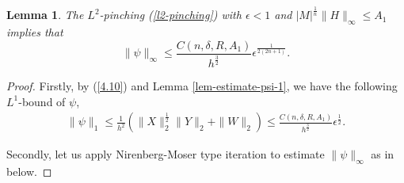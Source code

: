\documentclass{amsart}
\numberwithin{equation}{section}
\newtheorem{lem}[theo]{Lemma}
\theoremstyle{remark}
\renewcommand{\(}{\left(}
\renewcommand{\)}{\right)}
\renewcommand{\~}{\tilde}
\renewcommand{\-}{\overline}
\renewcommand{\d}{\delta}
\newcommand{\e}{\epsilon}
\begin{document}
\begin{lem}\label{lem-infinity-bound-psi}
	The $L^2$-pinching (\ref{l2-pinching}) with $\e<1$ and $|M|^\frac{1}{n}\|H\|_\infty\leq A_1$ implies that
	\begin{equation}\label{ineq-upper-bound-infinity-psi}
	\|\psi\|_\infty \leq \frac{C(n,\d,R,A_1)}{h^\frac{3}{2}}\e^\frac{1}{2(2n+1)}.
	\end{equation}
\end{lem}
\begin{proof}
	Firstly, by (\ref{4.10}) and Lemma \ref{lem-estimate-psi-1}, we have the following $L^1$-bound of $\psi$,
	\begin{align*}
	\|\psi\|_1 \leq \frac{1}{h^2} \(\|X\|_2^\frac{1}{2}\|Y\|_2+\|W\|_2\)
	\leq \frac{C(n,\d,R,A_1)}{h^\frac{3}{2}}\e^\frac{1}{2}.
	\end{align*}
	
	Secondly, let us apply Nirenberg-Moser type iteration to estimate $\|\psi\|_\infty$ as in below.
	

\end{proof}
\end{document}
